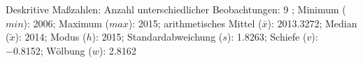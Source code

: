 				\label{tableValues:mres042d}
				\vspace*{-\baselineskip}
                    \begin{noten}
                	    \note{} Deskritive Maßzahlen:
                	    Anzahl unterschiedlicher Beobachtungen: 9%
                	    ; 
                	      Minimum ($min$): 2006; 
                	      Maximum ($max$): 2015; 
                	      arithmetisches Mittel ($\bar{x}$): \num[round-mode=places,round-precision=2]{2013,3272}; 
                	      Median ($\tilde{x}$): 2014; 
                	      Modus ($h$): 2015; 
                	      Standardabweichung ($s$): \num[round-mode=places,round-precision=2]{1,8263}; 
                	      Schiefe ($v$): \num[round-mode=places,round-precision=2]{-0,8152}; 
                	      Wölbung ($w$): \num[round-mode=places,round-precision=2]{2,8162}
                     \end{noten}


